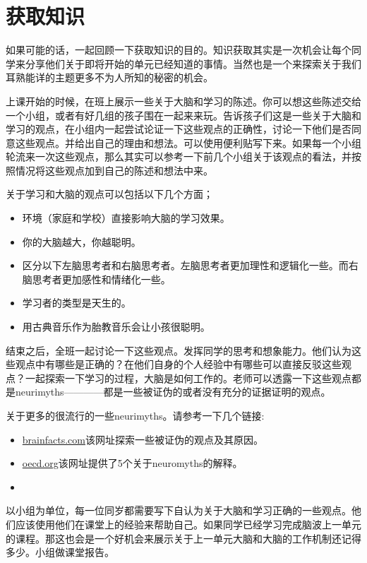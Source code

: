 \chapter{获取知识}
    如果可能的话，一起回顾一下获取知识的目的。知识获取其实是一次机会让每个同学来分享他们关于即将开始的单元已经知道的事情。当然也是一个来探索关于我们耳熟能详的主题更多不为人所知的秘密的机会。\par
    上课开始的时候，在班上展示一些关于大脑和学习的陈述。你可以想这些陈述交给一个小组，或者有好几组的孩子围在一起来来玩。告诉孩子们这是一些关于大脑和学习的观点，在小组内一起尝试论证一下这些观点的正确性，讨论一下他们是否同意这些观点。并给出自己的理由和想法。可以使用便利贴写下来。如果每一个小组轮流来一次这些观点，那么其实可以参考一下前几个小组关于该观点的看法，并按照情况将这些观点加到自己的陈述和想法中来。\par
    关于学习和大脑的观点可以包括以下几个方面；\par
    \begin{itemize}
      \item 环境（家庭和学校）直接影响大脑的学习效果。
      \item 你的大脑越大，你越聪明。 
      \item 区分以下左脑思考者和右脑思考者。左脑思考者更加理性和逻辑化一些。而右脑思考者更加感性和情绪化一些。
      \item 学习者的类型是天生的。
      \item 用古典音乐作为胎教音乐会让小孩很聪明。
    \end{itemize}  
    结束之后，全班一起讨论一下这些观点。发挥同学的思考和想象能力。他们认为这些观点中有哪些是正确的？在他们自身的个人经验中有哪些可以直接反驳这些观点？一起探索一下学习的过程，大脑是如何工作的。老师可以透露一下这些观点都是neurimyths————都是一些被证伪的或者没有充分的证据证明的观点。\par
    关于更多的很流行的一些neurimyths。请参考一下几个链接:\par
    \begin{itemize}
      \item \href{http://www.brainfacts.org/neuromyths/}{brainfacts.com}该网址探索一些被证伪的观点及其原因。
      \item \href{http://www.oecd.org/edu/ceri/neuromyths.htm}{oecd.org}该网址提供了5个关于neuromyths的解释。 
      \item
    \end{itemize} 
    以小组为单位，每一位同岁都需要写下自认为关于大脑和学习正确的一些观点。他们应该使用他们在课堂上的经验来帮助自己。如果同学已经学习完成脑波上一单元的课程。那这也会是一个好机会来展示关于上一单元大脑和大脑的工作机制还记得多少。小组做课堂报告。\par
